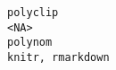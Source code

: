 \documentclass[
  letterpaper,
  DIV=11,
  numbers=noendperiod]{scrreprt}
\begin{document}
\begin{verbatim}
polyclip                                                                                                                                                                                                                                                                                                                                                                                                                                                                                                                                                                                                                                                                                                                                                                                                                                                                                                                                                                                                                                                                                                                                                                                                                                                                                                 <NA>
polynom                                                                                                                                                                                                                                                                                                                                                                                                                                                                                                                                                                                                                                                                                                                                                                                                                                                                                                                                                                                                                                                                                                                                                                                                                                                                                      knitr, rmarkdown

\end{verbatim}
\end{document}
